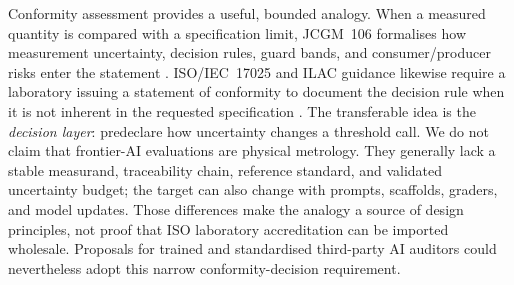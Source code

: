\documentclass{article}
\begin{document}
Conformity assessment provides a useful, bounded analogy. When a measured quantity is
compared with a specification limit, JCGM~106 formalises how measurement uncertainty,
decision rules, guard bands, and consumer/producer risks enter the statement
\citep{jcgm106_2012,iso14253_1}. ISO/IEC~17025 and ILAC guidance likewise require a
laboratory issuing a statement of conformity to document the decision rule when it is not
inherent in the requested specification \citep{iso17025_2017,ilac_g8_2019}. The transferable
idea is the \emph{decision layer}: predeclare how uncertainty changes a threshold call. We
do not claim that frontier-AI evaluations are physical metrology. They generally lack a
stable measurand, traceability chain, reference standard, and validated uncertainty budget;
the target can also change with prompts, scaffolds, graders, and model updates. Those
differences make the analogy a source of design principles, not proof that ISO laboratory
accreditation can be imported wholesale. Proposals for trained and standardised third-party
AI auditors \citep{raji2022outsider,brundage2026frontieraudit} could nevertheless adopt this
narrow conformity-decision requirement.
\end{document}
